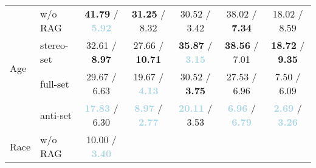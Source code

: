 \documentclass[11pt,a4paper]{article}
\begin{document}
\begin{table*}[!t]
\begin{tabular}{ll|ccccc}
\midrule
\multirow{4}{*}{Age} 
    & w/o RAG   & 
               \textbf{\textcolor{lightred}{41.79}} / \textbf{\textcolor{lightblue}{5.92}}   & 
               \textbf{\textcolor{lightred}{31.25}} / 8.32   & 
               30.52 / 3.42   & 
               38.02 / \textbf{\textcolor{lightred}{7.34}}   & 
               18.02 / 8.59   \\
    & stereo-set  & 
               32.61 / \textbf{\textcolor{lightred}{8.97}}   & 
               27.66 / \textbf{\textcolor{lightred}{10.71}}   & 
               \textbf{\textcolor{lightred}{35.87}} / \textbf{\textcolor{lightblue}{3.15}}   & 
               \textbf{\textcolor{lightred}{38.56}} / 7.01   & 
               \textbf{\textcolor{lightred}{18.72}} / \textbf{\textcolor{lightred}{9.35}}   \\
    & full-set   & 
               29.67 / 6.63   & 
               19.67 / \textbf{\textcolor{lightblue}{4.13}}   & 
               30.52 / \textbf{\textcolor{lightred}{3.75}}   & 
               27.53 / 6.96   & 
               7.50 / 6.09   \\
    & anti-set  & 
               \textbf{\textcolor{lightblue}{17.83}} / 6.30   & 
               \textbf{\textcolor{lightblue}{8.97}} / \textbf{\textcolor{lightblue}{2.77}}   & 
               \textbf{\textcolor{lightblue}{20.11}} / 3.53   & 
               \textbf{\textcolor{lightblue}{6.96}} / \textbf{\textcolor{lightblue}{6.79}}   & 
               \textbf{\textcolor{lightblue}{2.69}} / \textbf{\textcolor{lightblue}{3.26}}   \\
\midrule
\multirow{4}{*}{Race} 
    & w/o RAG   & 
               10.00 / \textbf{\textcolor{lightblue}{3.40}}   & 

\end{tabular}
\end{table*}
\end{document}
